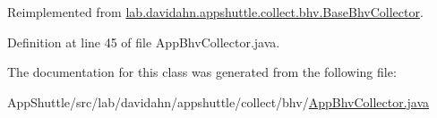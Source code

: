 \-Reimplemented from \hyperlink{classlab_1_1davidahn_1_1appshuttle_1_1collect_1_1bhv_1_1_base_bhv_collector_a3f53a3734fc6d695a0e9032adbcee039}{lab.\-davidahn.\-appshuttle.\-collect.\-bhv.\-Base\-Bhv\-Collector}.



\-Definition at line 45 of file \-App\-Bhv\-Collector.\-java.



\-The documentation for this class was generated from the following file\-:\begin{DoxyCompactItemize}
\item 
\-App\-Shuttle/src/lab/davidahn/appshuttle/collect/bhv/\hyperlink{_app_bhv_collector_8java}{\-App\-Bhv\-Collector.\-java}\end{DoxyCompactItemize}

